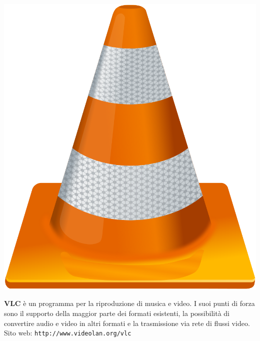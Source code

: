 \documentclass[a4paper, 12pt]{extarticle}
\begin{document}
\begin{minipage}{.2\linewidth}
    \includegraphics[width=.9\linewidth]{img/opuscolo-12.png}
\end{minipage}
\begin{minipage}{.75\linewidth}
\textbf{VLC} è un programma per la riproduzione di musica e video. I
suoi punti di forza sono il supporto della maggior parte dei formati esistenti, la
possibilità di convertire audio e video in altri formati e la
trasmissione via rete di flussi video.\\
Sito web: \texttt{http://www.videolan.org/vlc}
\end{minipage}
\end{document}
